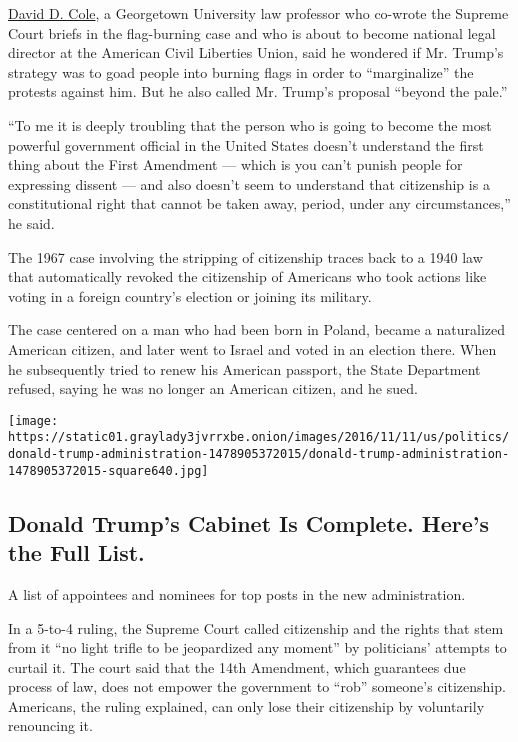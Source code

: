 \href{https://www.law.georgetown.edu/faculty/cole-david-d.cfm}{David D.
Cole}, a Georgetown University law professor who co-wrote the Supreme
Court briefs in the flag-burning case and who is about to become
national legal director at the American Civil Liberties Union, said he
wondered if Mr. Trump's strategy was to goad people into burning flags
in order to ``marginalize'' the protests against him. But he also called
Mr. Trump's proposal ``beyond the pale.''

``To me it is deeply troubling that the person who is going to become
the most powerful government official in the United States doesn't
understand the first thing about the First Amendment --- which is you
can't punish people for expressing dissent --- and also doesn't seem to
understand that citizenship is a constitutional right that cannot be
taken away, period, under any circumstances,'' he said.

The 1967 case involving the stripping of citizenship traces back to a
1940 law that automatically revoked the citizenship of Americans who
took actions like voting in a foreign country's election or joining its
military.

The case centered on a man who had been born in Poland, became a
naturalized American citizen, and later went to Israel and voted in an
election there. When he subsequently tried to renew his American
passport, the State Department refused, saying he was no longer an
American citizen, and he sued.

\href{https://www.nytimes3xbfgragh.onion/interactive/2016/us/politics/donald-trump-administration.html}{}

\texttt{[image: https://static01.graylady3jvrrxbe.onion/images/2016/11/11/us/politics/donald-trump-administration-1478905372015/donald-trump-administration-1478905372015-square640.jpg]}

\hypertarget{donald-trumps-cabinet-is-complete-heres-the-full-list}{%
\subsection{Donald Trump's Cabinet Is Complete. Here's the Full
List.}\label{donald-trumps-cabinet-is-complete-heres-the-full-list}}

A list of appointees and nominees for top posts in the new
administration.

In a 5-to-4 ruling, the Supreme Court called citizenship and the rights
that stem from it ``no light trifle to be jeopardized any moment'' by
politicians' attempts to curtail it. The court said that the 14th
Amendment, which guarantees due process of law, does not empower the
government to ``rob'' someone's citizenship. Americans, the ruling
explained, can only lose their citizenship by voluntarily renouncing it.

